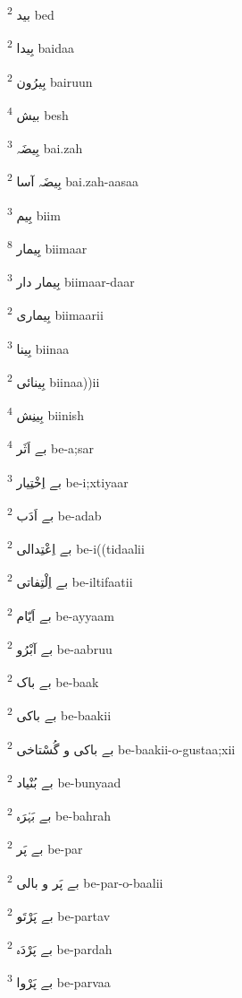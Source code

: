 \documentclass[12pt]{article}
\begin{document}
\begin{RTL}
\begin{multicols}{5}
{\ur بید}   \textsuperscript{2} bed

{\ur بِیدا}   \textsuperscript{2} baidaa

{\ur بِیرُون}   \textsuperscript{2} bairuun

{\ur بیش}   \textsuperscript{4} besh

{\ur بِیضَہ}   \textsuperscript{3} bai.zah

{\ur بِیضَہ آسا}   \textsuperscript{2} bai.zah-aasaa

{\ur بِیم}   \textsuperscript{3} biim

{\ur بِیمار}   \textsuperscript{8} biimaar

{\ur بِیمار دار}   \textsuperscript{3} biimaar-daar

{\ur بِیماری}   \textsuperscript{2} biimaarii

{\ur بِینا}   \textsuperscript{3} biinaa

{\ur بِینائی}   \textsuperscript{2} biinaa))ii

{\ur بِینِش}   \textsuperscript{4} biinish

{\ur بے اَثَر}   \textsuperscript{4} be-a;sar

{\ur بے اِخْتِیار}   \textsuperscript{3} be-i;xtiyaar

{\ur بے اَدَب}   \textsuperscript{2} be-adab

{\ur بے اِعْتِدالی}   \textsuperscript{2} be-i((tidaalii

{\ur بے اِلْتِفاتی}   \textsuperscript{2} be-iltifaatii

{\ur بے اَیّام}   \textsuperscript{2} be-ayyaam

{\ur بے آبْرُو}   \textsuperscript{2} be-aabruu

{\ur بے باک}   \textsuperscript{2} be-baak

{\ur بے باکی}   \textsuperscript{2} be-baakii

{\ur بے باکی و گُسْتاخی}   \textsuperscript{2} be-baakii-o-gustaa;xii

{\ur بے بُنْیاد}   \textsuperscript{2} be-bunyaad

{\ur بے بَہْرَہ}   \textsuperscript{2} be-bahrah

{\ur بے پَر}   \textsuperscript{2} be-par

{\ur بے پَر و بالی}   \textsuperscript{2} be-par-o-baalii

{\ur بے پَرْتَو}   \textsuperscript{2} be-partav

{\ur بے پَرْدَہ}   \textsuperscript{2} be-pardah

{\ur بے پَرْوا}   \textsuperscript{3} be-parvaa


\end{multicols}
\end{RTL}
\end{document}
